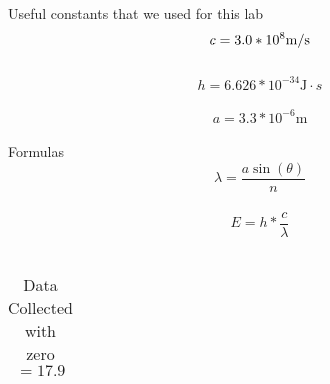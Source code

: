 \documentclass{article}
\begin{document}
    Useful constants that we used for this lab\\
    $$c = 3.0 * 10^{8} \si[per-mode=symbol]{\metre\per\second}$$\\
    $$h = 6.626 * 10^{-34} \si{\joule} \cdot s$$\\
    $$a = 3.3 * 10^{-6} \si{\metre}$$\\
    Formulas\\
    $$\lambda = \dfrac{a \sin(\theta)}{n}$$\\
    $$E = h * \dfrac{c}{\lambda}$$\\

    \begin{longtable}[c]{|c c |}
        \caption{Data Collected with zero $ = 17.9$ \label{long}}\\
        \hline

        \hline
    \end{longtable}
\end{document}

